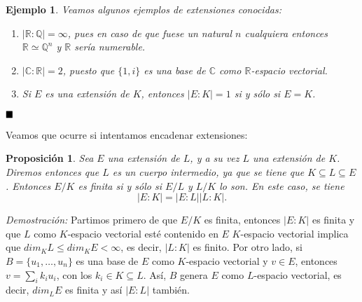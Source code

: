 \documentclass[12pt]{article}
\newtheorem{proposition}[theorem]{Proposición}
\newtheorem{example}{Ejemplo}[theorem]
\begin{document}
\begin{example} Veamos algunos ejemplos de extensiones conocidas: \begin{enumerate}
\item $|\mathbb{R} : \mathbb{Q}| = \infty$, pues en caso de que fuese un natural $n$ cualquiera entonces $\mathbb{R} \simeq \mathbb{Q}^{n}$ y $\mathbb{R}$ sería numerable.
\item $|\mathbb{C} : \mathbb{R} | = 2$, puesto que $\lbrace 1, i \rbrace$ es una base de $\mathbb{C}$ como $\mathbb{R}$-espacio vectorial.
\item Si $E$ es una extensión de $K$, entonces $|E : K | = 1$ si y sólo si $E = K$.
\end{enumerate}
\end{example}

$\hfill \blacksquare$

Veamos que ocurre si intentamos encadenar extensiones:
\begin{proposition} \label{eq:trgr} Sea $E$ una extensión de $L$, y a su vez $L$ una extensión de $K$. Diremos entonces que $L$ es un cuerpo intermedio, ya que se tiene que $K \subseteq L \subseteq E$. Entonces $E/K$ es finita si y sólo si $E/L$ y $L/K$ lo son. En este caso, se tiene $$|E: K| = |E:L| |L:K|.$$
\end{proposition}
\emph{Demostración: } Partimos primero de que $E/K$ es finita, entonces $|E:K|$ es finita y que $L$ como $K$-espacio vectorial esté contenido en $E$ $K$-espacio vectorial implica que $dim_{K} L \leq dim_{K} E < \infty$, es decir, $|L:K|$ es finito. Por otro lado, si $B = \lbrace u_{1}, \ldots, u_{n}\rbrace$ es una base de $E$ como $K$-espacio vectorial y $v \in E$, entonces $v = \sum_{i} k_{i}u_{i}$, con los $k_{i} \in K \subseteq L$. Así, $B$ genera $E$ como $L$-espacio vectorial, es decir, $dim_{L}E$ es finita y así $|E:L|$ también.
\end{document}
